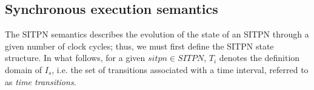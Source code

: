 


\subsection{Synchronous execution semantics}
\label{subsec:hpn-particularities}

 The SITPN semantics describes
the evolution of the state of an SITPN through a given number of clock
cycles; thus, we must first define the SITPN state structure. In what
follows, for a given $sitpn\in{}SITPN$, $T_i$ denotes the definition
domain of $I_s$, i.e. the set of transitions associated with a time
interval, referred to as \textit{time transitions}.

